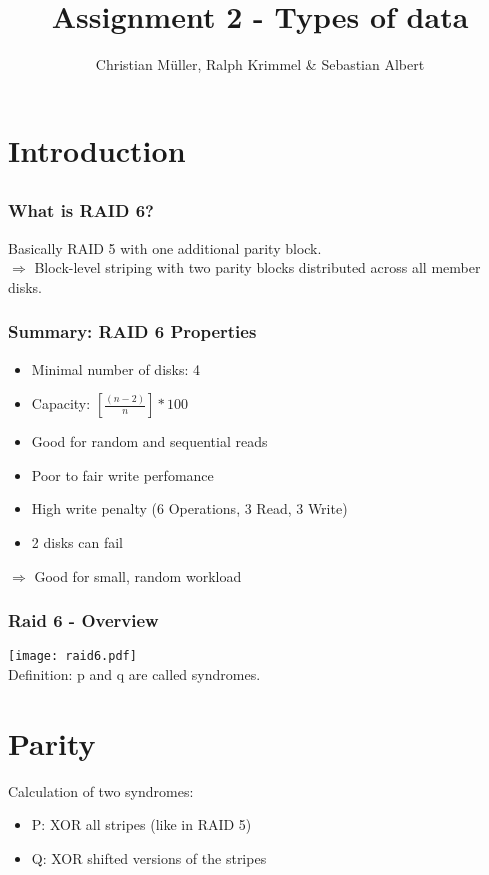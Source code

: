 \documentclass{beamer}
\title{Assignment 2 - Types of data}
\author{Christian Müller, Ralph Krimmel \& Sebastian Albert}
\begin{document}
\section{Introduction}
\subsection*{}
\begin{frame}
	\maketitle
\end{frame}


\begin{frame}
	\frametitle{What is RAID 6?}
	Basically RAID 5 with one additional parity block. \\
	$\Rightarrow$  Block-level striping with two parity blocks distributed across all member disks.
\end{frame}

\begin{frame}
	\frametitle{Summary: RAID 6 Properties}
	\begin{itemize}
		\item Minimal number of disks: 4 
		\item Capacity: $[\frac{(n-2)}{n}]*100$
		\item Good for random and sequential reads
		\item Poor to fair write perfomance
		\item High write penalty (6 Operations, 3 Read, 3 Write)
		\item 2 disks can fail
	\end{itemize}
	$\Rightarrow$ Good for small, random workload
\end{frame}


\begin{frame}
	\frametitle{Raid 6 - Overview}
	\texttt{[image: raid6.pdf]} \\
	Definition: p and q are called syndromes.
\end{frame}

\section{Parity}
\begin{frame}
	Calculation of two syndromes:
	\begin{itemize}
		\item P: XOR all stripes (like in RAID 5)
		\item Q: XOR shifted  versions of the stripes
	\end{itemize}
\end{frame}
\end{document}
